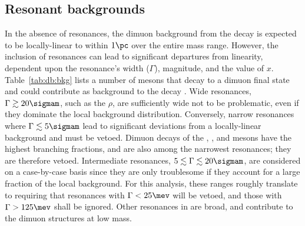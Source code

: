 \subsection{Resonant backgrounds}
In the absence of resonances,
the dimuon background from the \sm decay \btokstrmumu is expected to be locally-linear
to within $1\pc$ over the entire mass range.
However, the inclusion of resonances can lead to significant departures from linearity, dependent
upon the resonance's width ($\Gamma$), magnitude, and the value of $x$.
Table~\ref{tab:db:bkg} lists a number of mesons that decay to a dimuon final state and could
contribute as background to the decay \decay{\Bd}{\Kstarz\mumu}.
Wide resonances, $\Gamma\gtrsim20\sigmam$, such as the $\rho$,
are sufficiently wide not to be problematic, even if they dominate the local background
distribution.
Conversely, narrow resonances where $\Gamma\lesssim5\sigmam$ lead to significant deviations from a
locally-linear background and must be vetoed.
Dimuon decays of the \phii, \jpsi, and \psitwos mesons have the highest branching fractions, and
are also among the
narrowest resonances; they are therefore vetoed.
Intermediate resonances, $5\lesssim\Gamma\lesssim20\sigmam$, are considered on a case-by-case
basis since they are only troublesome if they account for a large fraction of the local background.
For this analysis, these ranges roughly translate to requiring that resonances with $\Gamma<25\mev$
will be vetoed, and those with $\Gamma>125\mev$ shall be ignored.
Other resonances in  are broad, and contribute to the dimuon
structures at low mass.



